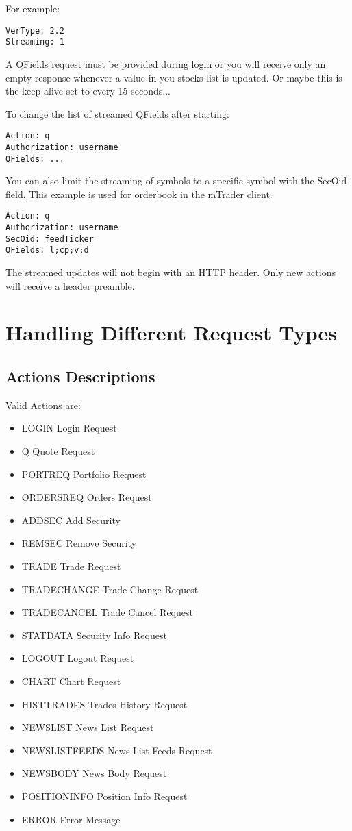 \documentclass[12pt,twoside,letterpaper]{report}
\begin{document}
For example:
\begin{verbatim}
VerType: 2.2
Streaming: 1
\end{verbatim}

A QFields request must be provided during login or you will receive only an empty response whenever a value in you stocks list is updated. Or maybe this is the keep-alive set to every 15 seconds...

To change the list of streamed QFields after starting:
\begin{verbatim}
Action: q
Authorization: username
QFields: ...
\end{verbatim}

You can also limit the streaming of symbols to a specific symbol with the SecOid field. This example is used for orderbook in the mTrader client.
\begin{verbatim}
Action: q
Authorization: username
SecOid: feedTicker
QFields: l;cp;v;d
\end{verbatim}

The streamed updates will not begin with an HTTP header. Only new actions will receive a header preamble.

\chapter*{Handling Different Request Types}
\section*{Actions Descriptions}
Valid Actions are:
\begin{itemize}
\item LOGIN Login Request
\item Q Quote Request
\item PORTREQ Portfolio Request
\item ORDERSREQ Orders Request
\item ADDSEC Add Security
\item REMSEC Remove Security
\item TRADE Trade Request
\item TRADECHANGE Trade Change Request
\item TRADECANCEL Trade Cancel Request
\item STATDATA Security Info Request
\item LOGOUT Logout Request
\item CHART Chart Request
\item HISTTRADES Trades History Request
\item NEWSLIST News List Request
\item NEWSLISTFEEDS News List Feeds Request
\item NEWSBODY News Body Request
\item POSITIONINFO Position Info Request
\item ERROR Error Message
\end{itemize}
\end{document}

